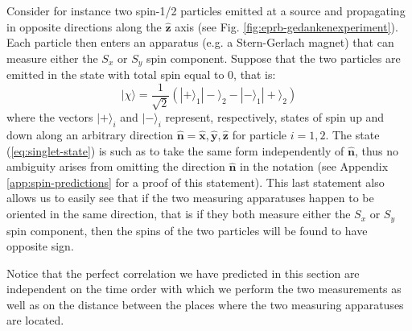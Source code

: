 Consider for instance two spin-1/2 particles emitted at a source and propagating in opposite directions along the $\mathbf{\hat{z}}$ axis (see Fig. \ref{fig:eprb-gedankenexperiment}).  Each particle then enters an apparatus (e.g. a Stern-Gerlach magnet) that can measure either the $S_x$ or $S_y$ spin component. Suppose that the two particles are emitted in the state with total spin equal to $0$, that is:
\begin{equation}
  |\chi\rangle = \frac{1}{\sqrt{2}} \left( |+\rangle_1 |-\rangle_2 - |-\rangle_1 |+\rangle_2 \right)
  \label{eq:singlet-state}
\end{equation}
where the vectors $|+\rangle_i$ and $|-\rangle_i$ represent, respectively, states of spin up and down along an arbitrary direction $\mathbf{\hat{n}} = \mathbf{\hat{x}}, \mathbf{\hat{y}}, \mathbf{\hat{z}}$ for particle $i = 1, 2$. The state (\ref{eq:singlet-state}) is such as to take the same form independently of $\mathbf{\hat{n}}$, thus no ambiguity arises from omitting the direction $\mathbf{\hat{n}}$ in the notation (see Appendix \ref{app:spin-predictions} for a proof of this statement). This last statement also allows us to easily see that if the two measuring apparatuses happen to be oriented in the same direction, that is if they both measure either the $S_x$ or $S_y$ spin component, then the spins of the two particles will be found to have opposite sign.%

\begin{remark}
  Notice that the perfect correlation we have predicted in this section are independent on the time order with which we perform the two measurements as well as on the distance between the places where the two measuring apparatuses are located.%
\end{remark}

